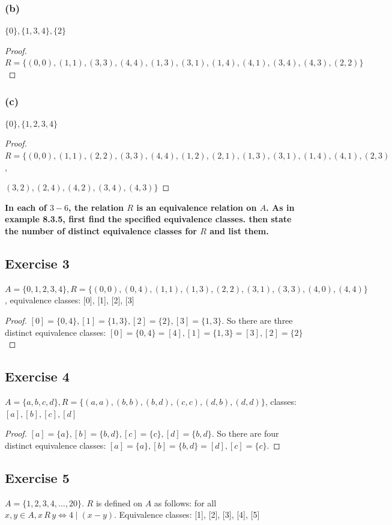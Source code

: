 \documentclass[14pt]{extarticle}
\newcommand{\cy}{\color{cyan}}
\begin{document}
\subsubsection{(b)}
\(\{0\}, \{1, 3, 4\}, \{2\}\)
\begin{proof}
\(R = \{(0,0),(1,1),(3,3),(4,4),(1,3),(3,1),(1,4),(4,1),(3,4),(4,3),(2,2)\}\)
\end{proof}

\subsubsection{(c)}
\(\{0\}, \{1, 2, 3, 4\}\)

\begin{proof}
\(R = \{(0,0),(1,1),(2,2),(3,3),(4,4),(1,2),(2,1),(1,3),(3,1),(1,4),(4,1),(2,3)\),

\((3,2),(2,4),(4,2),(3,4),(4,3)\}\)
\end{proof}

{\bf \cy In each of $3-6$, the relation $R$ is an equivalence relation on $A$. As in example 8.3.5, first 
find the specified equivalence classes. then state the number of distinct equivalence classes for $R$ and list them.}

\subsection{Exercise 3}
\(A = \{0, 1, 2, 3, 4\}, R = \{(0, 0), (0, 4), (1, 1), (1, 3), (2, 2), (3, 1), (3, 3), (4, 0), (4, 4)\}\),
equivalence classes: [0], [1], [2], [3]

\begin{proof}
\([0] = \{0, 4\}, [1] = \{1, 3\}, [2] = \{2\}, [3] = \{1, 3\}\). So there are three distinct equivalence classes: 
\([0] = \{0, 4\} = [4], [1] = \{1, 3\} = [3], [2] = \{2\}\)
\end{proof}

\subsection{Exercise 4}
\(A = \{a, b, c, d\}, R = \{(a, a), (b, b), (b, d), (c, c), (d, b), (d, d)\}\), classes: \([a], [b], [c], [d]\)

\begin{proof}
\([a] = \{a\}, [b] = \{b, d\}, [c] = \{c\}, [d] = \{b, d\}\). So there are four distinct equivalence classes: 
\([a] = \{a\}, [b] = \{b, d\} = [d], [c] = \{c\}\).
\end{proof}

\subsection{Exercise 5}
\(A = \{1, 2, 3, 4, \ldots, 20\}\). \(R\) is defined on \(A\) as follows: for all \(x, y \in A, x \,R\, y \iff 4 
\mid (x - y)\). Equivalence classes: [1], [2], [3], [4], [5]
\end{document}
